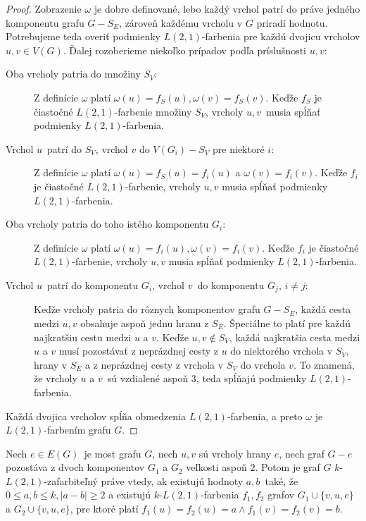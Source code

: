 \begin{proof}
    Zobrazenie $\omega$ je dobre definované, lebo každý vrchol patrí do práve jedného komponentu grafu
    $G - S_E$, zároveň každému vrcholu v $G$ priradí hodnotu. Potrebujeme teda overiť podmienky $L(2,1)$-farbenia
    pre každú dvojicu vrcholov $u, v \in V(G)$. Ďalej rozoberieme niekoľko prípadov podľa príslušnosti $u, v$:

    \begin{description}
        \item[Oba vrcholy patria do množiny $S_V$:] Z definície $\omega$ platí $\omega(u) = f_S(u), \omega(v) = f_S(v)$.
        Keďže $f_S$ je čiastočné $L(2,1)$-farbenie množiny $S_V$, vrcholy $u, v$ musia spĺňať podmienky $L(2,1)$-farbenia.

        \item[Vrchol $u$ patrí do $S_V$, vrchol $v$ do $V(G_i) - S_V$ pre niektoré $i$:] Z definície $\omega$ platí
        $\omega(u) = f_S(u) = f_i(u)$ a $\omega(v) = f_i(v)$. Keďže $f_i$ je čiastočné $L(2, 1)$-farbenie, vrcholy
        $u, v$ musia spĺňať podmienky $L(2,1)$-farbenia.
        
        \item[Oba vrcholy patria do toho istého komponentu $G_i$:] Z definície
        $\omega$ platí $\omega(u) = f_i(u), \omega(v) = f_i(v)$. Keďže $f_i$ je čiastočné $L(2,1)$-farbenie, vrcholy
        $u, v$ musia spĺňať podmienky $L(2,1)$-farbenia.

        \item[Vrchol $u$ patrí do komponentu $G_i$, vrchol $v$ do komponentu $G_j$, $i \neq j$:] Keďže vrcholy patria
        do rôznych komponentov grafu $G - S_E$, každá cesta medzi $u, v$ obsahuje aspoň jednu hranu z $S_E$. Špeciálne
        to platí pre každú najkratšiu cestu medzi $u$ a $v$. Keďže $u, v \notin S_V$, každá najkratšia cesta medzi $u$
        a $v$ musí pozostávať z neprázdnej cesty z $u$ do niektorého vrchola v $S_V$, hrany v $S_E$ a z neprázdnej
        cesty z vrchola v $S_V$ do vrchola $v$. To znamená, že vrcholy $u$ a $v$ sú vzdialené aspoň $3$, teda spĺňajú
        podmienky $L(2,1)$-farbenia.
    \end{description}

    Každá dvojica vrcholov spĺňa obmedzenia $L(2,1)$-farbenia, a preto $\omega$ je $L(2,1)$-farbením grafu $G$. \qedhere

\end{proof}

\begin{dosl}
    Nech $e \in E(G)$ je most grafu $G$, nech $u, v$ sú vrcholy hrany $e$, nech graf $G - e$ pozostáva z dvoch
    komponentov $G_1$ a $G_2$ veľkosti aspoň $2$. Potom je graf $G$ $k$-$L(2,1)$-zafarbiteľný práve vtedy, ak
    existujú hodnoty $a, b$ také, že $0 \leq a, b \leq k, \left| a - b \right| \ge 2$ a existujú $k$-$L(2,1)$-farbenia $f_1, f_2$ grafov
    $G_1 \cup \{v, u, e\}$ a $G_2 \cup \{v, u, e\}$, pre ktoré platí $f_1(u) = f_2(u) = a \wedge f_1(v) = f_2(v) = b$.
\end{dosl}

